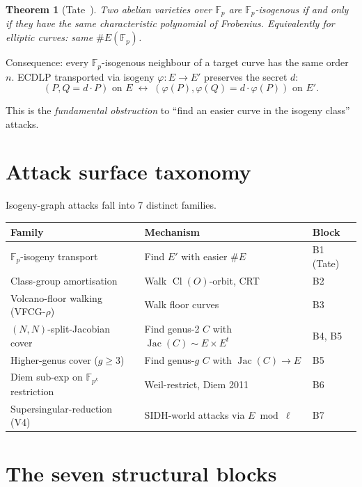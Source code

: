 \documentclass[11pt,a4paper]{article}
\newtheorem{theorem}{Theorem}[section]
\theoremstyle{definition}
\newcommand{\FF}{\mathbb{F}}
\newcommand{\Cl}{\operatorname{Cl}}
\newcommand{\Jac}{\operatorname{Jac}}
\begin{document}
\begin{theorem}[Tate~\cite{tate1966}]
Two abelian varieties over $\FF_p$ are $\FF_p$-isogenous if and
only if they have the same characteristic polynomial of Frobenius.
Equivalently for elliptic curves: same $\#E(\FF_p)$.
\end{theorem}

Consequence: every $\FF_p$-isogenous neighbour of a target curve
has the same order $n$. ECDLP transported via isogeny
$\varphi \colon E \to E'$ preserves the secret $d$:
\[
   (P, Q = d \cdot P) \text{ on } E \;\longleftrightarrow\;
   (\varphi(P), \varphi(Q) = d \cdot \varphi(P)) \text{ on } E'.
\]

This is the \emph{fundamental obstruction} to ``find an easier
curve in the isogeny class'' attacks.

\section{Attack surface taxonomy}\label{sec:taxonomy}

Isogeny-graph attacks fall into 7 distinct families.

\begin{center}
\begin{tabular}{lll}
\toprule
Family & Mechanism & Block \\
\midrule
$\FF_p$-isogeny transport & Find $E'$ with easier $\#E$ & B1 (Tate) \\
Class-group amortisation & Walk $\Cl(O)$-orbit, CRT & B2 \\
Volcano-floor walking (VFCG-$\rho$) & Walk floor curves & B3 \\
$(N,N)$-split-Jacobian cover & Find genus-2 $C$ with $\Jac(C) \sim E \times E^t$ & B4, B5 \\
Higher-genus cover ($g \geq 3$) & Find genus-$g$ $C$ with $\Jac(C) \to E$ & B5 \\
Diem sub-exp on $\FF_{p^k}$ restriction & Weil-restrict, Diem 2011 & B6 \\
Supersingular-reduction (V4) & SIDH-world attacks via $E \bmod \ell$ & B7 \\
\bottomrule
\end{tabular}
\end{center}

\section{The seven structural blocks}\label{sec:blocks}
\end{document}

